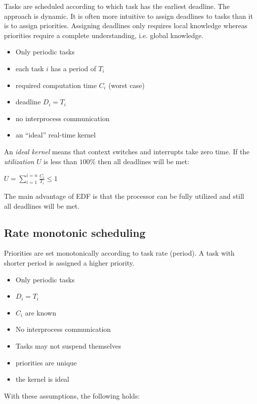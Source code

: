 \documentclass[a4paper]{article}
\begin{document}
Tasks are scheduled according to which task has the earliest deadline. The
approach is dynamic. It is often more intuitive to assign deadlines to tasks
than it is to assign priorities. Assigning deadlines only requires local knowledge
whereas priorities require a complete understanding, i.e. global knowledge.

\begin{itemize}
  \item Only periodic tasks
  \item each task $i$ has a period of $T_i$
  \item required computation time $C_i$ (worst case)
  \item deadline $D_i = T_i$
  \item no interprocess communication
  \item an ``ideal'' real-time kernel
\end{itemize}

An \emph{ideal kernel} means that context switches and interrupts take zero time.
If the \emph{utilization} $U$ is less than $100\%$ then all deadlines will be met:

\begin{center}
$U = \sum_{i=1}^{i=n} \frac{C_i}{T_i} \leq 1$
\end{center}

The main advantage of EDF is that the processor can be fully utilized and still
all deadlines will be met.

\subsection{Rate monotonic scheduling}

Priorities are set monotonically according to task rate (period). A task with
shorter period is assigned a higher priority.

\begin{itemize}
  \item Only periodic tasks
  \item $D_i = T_i$
  \item $C_i$ are known
  \item No interprocess communication
  \item Tasks may not suspend themselves
  \item priorities are unique
  \item the kernel is ideal
\end{itemize}

With these assumptions, the following holds:
\end{document}
